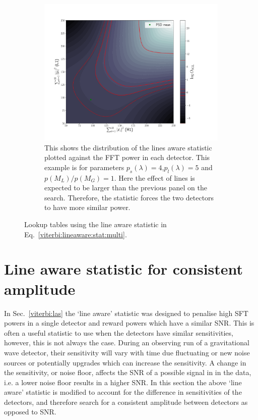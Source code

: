 \begin{figure}
\begin{subfigure}[h]{\linewidth}
\begin{minipage}{0.65\linewidth}
\includegraphics[width=1.\columnwidth]{C3_soap/lookup_linebig.pdf}
\end{minipage}\hfill
\begin{minipage}{0.35\linewidth}
\caption{This shows the distribution of the lines aware statistic plotted against the \ac{FFT} power in each detector. This example is for parameters $p_s(\lambda) = 4$,$p_l(\lambda) = 5$ and $p(M_L)/p(M_G) = 1$. Here the effect of lines is expected to be larger than the previous panel on the search. Therefore, the statistic forces the two detectors to have more similar power.}
\label{viterbi:plot:data}
\end{minipage}
\end{subfigure}
\caption{Lookup tables using the line aware statistic in Eq.~\ref{viterbi:lineaware:stat:multi}.}
\label{viterbi:las:osgl_plots}
\end{figure}


\section{\label{viterbi:lineawareamp}Line aware statistic for consistent amplitude}


In Sec.~\ref{viterbi:las} the `line aware' statistic was designed to penalise high \ac{SFT} powers in a single detector and reward powers which have a similar \ac{SNR}. This is often a useful statistic to use when the detectors have similar sensitivities, however, this is not always the case. During an observing run of a gravitational wave detector, their sensitivity will vary with time due fluctuating or new noise sources or potentially upgrades which can increase the sensitivity. A change in the sensitivity, or noise floor, affects the \ac{SNR} of a possible signal in in the data, i.e. a lower noise floor results in a higher \ac{SNR}. 
In this section the above `line aware' statistic is modified to account for the difference in sensitivities of the detectors, and therefore search for a consistent amplitude between detectors as opposed to \ac{SNR}.

